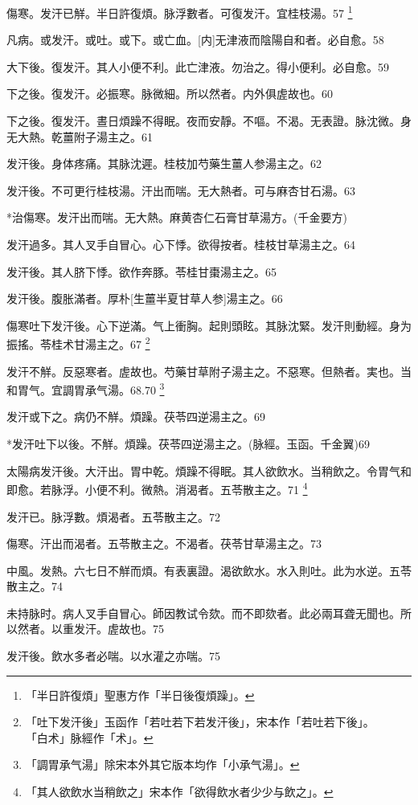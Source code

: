 \documentclass[12pt,twoside,UTF8,b5paper]{ctexbook}
\begin{document}
傷寒。发汗已觧。半日許復煩。脉浮數者。可復发汗。宜桂枝湯。57
	\footnote{「半日許復煩」聖惠方作「半日後復煩躁」。}

凡病。或发汗。或吐。或下。或亡血。[内]无津液而陰陽自和者。必自愈。58

大下後。復发汗。其人小便不利。此亡津液。勿治之。得小便利。必自愈。59

下之後。復发汗。必振寒。脉微細。所以然者。内外俱虗故也。60

下之後。復发汗。晝日煩躁不得眠。夜而安靜。不嘔。不渴。无表證。脉沈微。身无大熱。乾薑附子湯主之。61

发汗後。身体疼痛。其脉沈遲。桂枝加芍藥生薑人参湯主之。62

发汗後。不可更行桂枝湯。汗出而喘。无大熱者。可与麻杏甘石湯。63

*治傷寒。发汗出而喘。无大熱。麻黄杏仁石膏甘草湯方。(千金要方)

发汗過多。其人叉手自冒心。心下悸。欲得按者。桂枝甘草湯主之。64

发汗後。其人脐下悸。欲作奔豚。苓桂甘棗湯主之。65

发汗後。腹胀滿者。厚朴[生薑半夏甘草人参]湯主之。66

傷寒吐下发汗後。心下逆滿。气上衝胸。起則頭眩。其脉沈緊。发汗則動經。身为振搖。苓桂术甘湯主之。67
	\footnote{「吐下发汗後」玉函作「若吐若下若发汗後」，宋本作「若吐若下後」。\\「白术」脉經作「术」。}

发汗不觧。反惡寒者。虗故也。芍藥甘草附子湯主之。不惡寒。但熱者。実也。当和胃气。宜調胃承气湯。68.70
	\footnote{「調胃承气湯」除宋本外其它版本均作「小承气湯」。}

发汗或下之。病仍不觧。煩躁。茯苓四逆湯主之。69

*发汗吐下以後。不觧。煩躁。茯苓四逆湯主之。(脉經。玉函。千金翼)69

太陽病发汗後。大汗出。胃中乾。煩躁不得眠。其人欲飲水。当稍飲之。令胃气和即愈。若脉浮。小便不利。微熱。消渴者。五苓散主之。71
	\footnote{「其人欲飲水当稍飲之」宋本作「欲得飲水者少少与飲之」。}

发汗已。脉浮數。煩渴者。五苓散主之。72

傷寒。汗出而渴者。五苓散主之。不渴者。茯苓甘草湯主之。73

中風。发熱。六七日不觧而煩。有表裏證。渴欲飲水。水入則吐。此为水逆。五苓散主之。74

未持脉时。病人叉手自冒心。師因教试令欬。而不即欬者。此必兩耳聋无聞也。所以然者。以重发汗。虗故也。75

发汗後。飲水多者必喘。以水灌之亦喘。75
\end{document}
